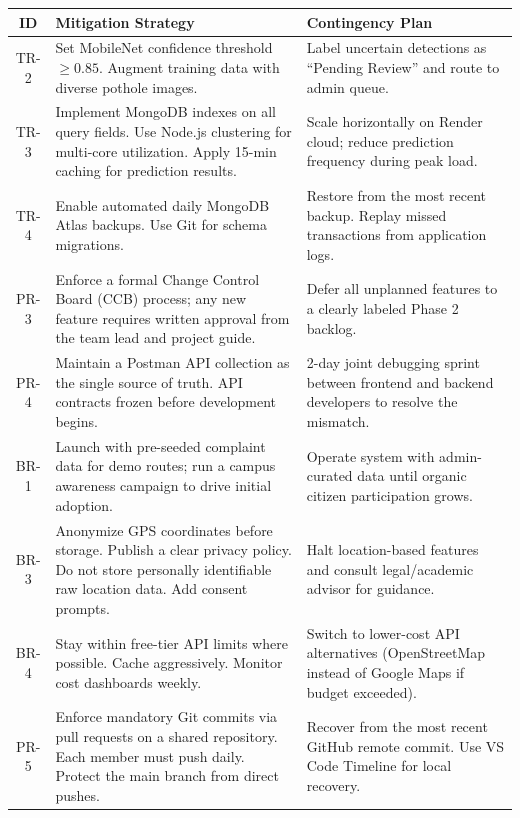 \documentclass[12pt,a4paper]{article}
\begin{document}
\begin{center}
\small
\begin{tabularx}{\textwidth}{c X X}
\toprule
\textbf{ID} & \textbf{Mitigation Strategy} & \textbf{Contingency Plan} \\
\midrule
TR-2 & Set MobileNet confidence threshold $\geq 0.85$. Augment training data with diverse pothole images. & Label uncertain detections as ``Pending Review'' and route to admin queue. \\[6pt]
TR-3 & Implement MongoDB indexes on all query fields. Use Node.js clustering for multi-core utilization. Apply 15-min caching for prediction results. & Scale horizontally on Render cloud; reduce prediction frequency during peak load. \\[6pt]
TR-4 & Enable automated daily MongoDB Atlas backups. Use Git for schema migrations. & Restore from the most recent backup. Replay missed transactions from application logs. \\[6pt]
PR-3 & Enforce a formal Change Control Board (CCB) process; any new feature requires written approval from the team lead and project guide. & Defer all unplanned features to a clearly labeled Phase 2 backlog. \\[6pt]
PR-4 & Maintain a Postman API collection as the single source of truth. API contracts frozen before development begins. & 2-day joint debugging sprint between frontend and backend developers to resolve the mismatch. \\[6pt]
BR-1 & Launch with pre-seeded complaint data for demo routes; run a campus awareness campaign to drive initial adoption. & Operate system with admin-curated data until organic citizen participation grows. \\[6pt]
BR-3 & Anonymize GPS coordinates before storage. Publish a clear privacy policy. Do not store personally identifiable raw location data. Add consent prompts. & Halt location-based features and consult legal/academic advisor for guidance. \\[6pt]
BR-4 & Stay within free-tier API limits where possible. Cache aggressively. Monitor cost dashboards weekly. & Switch to lower-cost API alternatives (OpenStreetMap instead of Google Maps if budget exceeded). \\[6pt]
PR-5 & Enforce mandatory Git commits via pull requests on a shared repository. Each member must push daily. Protect the main branch from direct pushes. & Recover from the most recent GitHub remote commit. Use VS Code Timeline for local recovery. \\[6pt]
\bottomrule
\end{tabularx}
\end{center}
\end{document}
